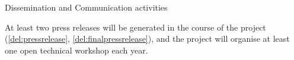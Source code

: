 \begin{Workpackage}{\thewpno}
\begin{task}{Dissemination and Communication activities}

  At least two press releases will be generated in the course of the
  project (\ref{del:pressrelease}, \ref{del:finalpressrelease}), and
  the project will organise at least one open technical workshop each
  year. %
\end{task}

\begin{WPDeliverables}
\end{WPDeliverables}


\end{Workpackage}
